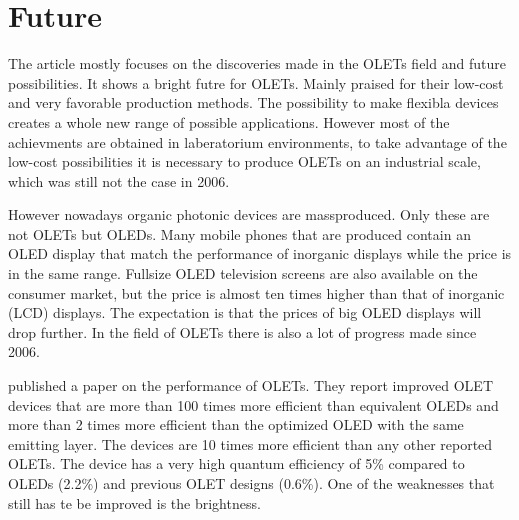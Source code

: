 \section{Future}
The article mostly focuses on the discoveries made in the OLETs field and future possibilities. It shows a bright futre for OLETs. Mainly praised for their low-cost and very favorable production methods. The possibility to make flexibla devices creates a whole new range of possible applications. However most of the achievments are obtained in laberatorium environments, to take advantage of the low-cost possibilities it is necessary to produce OLETs on an industrial scale, which was still not the case in 2006. 

However nowadays organic photonic devices are massproduced. Only these are not OLETs but OLEDs. Many mobile phones that are produced contain an OLED display that match the performance of inorganic displays while the price is in the same range. Fullsize OLED television screens are also available on the consumer market, but the price is almost ten times higher than that of inorganic (LCD) displays. The expectation is that the prices of big OLED displays will drop further. In the field of OLETs there is also a lot of progress made since 2006. 

\citet{Capelli} published a paper on the performance of OLETs. They report improved OLET devices that are more than 100 times more efficient than equivalent OLEDs and more than 2 times more efficient than the optimized OLED with the same emitting layer. The devices are 10 times more efficient than any other reported OLETs. The device has a very high quantum efficiency of 5\% compared to OLEDs (2.2\%) and previous OLET designs (0.6\%). One of the weaknesses that still has te be improved is the brightness.

